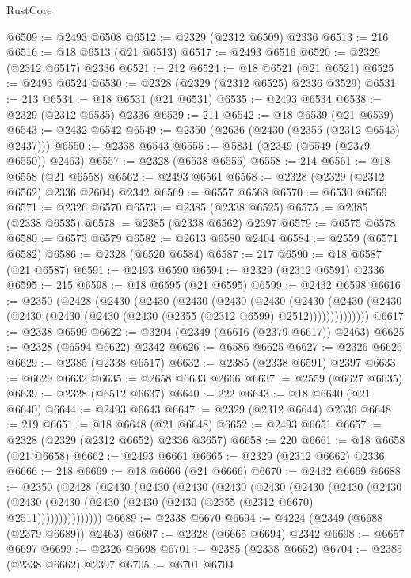 \begin{lexlean}{RustCore}
\begin{coremodule}
@6509 := @2493 @6508
@6512 := @2329 (@2312 @6509) @2336
@6513 := 216
@6516 := @18 @6513 (@21 @6513)
@6517 := @2493 @6516
@6520 := @2329 (@2312 @6517) @2336
@6521 := 212
@6524 := @18 @6521 (@21 @6521)
@6525 := @2493 @6524
@6530 := @2328 (@2329 (@2312 @6525) @2336 @3529)
@6531 := 213
@6534 := @18 @6531 (@21 @6531)
@6535 := @2493 @6534
@6538 := @2329 (@2312 @6535) @2336
@6539 := 211
@6542 := @18 @6539 (@21 @6539)
@6543 := @2432 @6542
@6549 := @2350 (@2636 (@2430 (@2355 (@2312 @6543) @2437)))
@6550 := @2338 @6543
@6555 := @5831 (@2349 (@6549 (@2379 @6550)) @2463)
@6557 := @2328 (@6538 @6555)
@6558 := 214
@6561 := @18 @6558 (@21 @6558)
@6562 := @2493 @6561
@6568 := @2328 (@2329 (@2312 @6562) @2336 @2604) @2342
@6569 := @6557 @6568
@6570 := @6530 @6569
@6571 := @2326 @6570
@6573 := @2385 (@2338 @6525)
@6575 := @2385 (@2338 @6535)
@6578 := @2385 (@2338 @6562) @2397
@6579 := @6575 @6578
@6580 := @6573 @6579
@6582 := @2613 @6580 @2404
@6584 := @2559 (@6571 @6582)
@6586 := @2328 (@6520 @6584)
@6587 := 217
@6590 := @18 @6587 (@21 @6587)
@6591 := @2493 @6590
@6594 := @2329 (@2312 @6591) @2336
@6595 := 215
@6598 := @18 @6595 (@21 @6595)
@6599 := @2432 @6598
@6616 := @2350
    (@2428
      (@2430
        (@2430
          (@2430
            (@2430
              (@2430
                (@2430
                  (@2430 (@2430 (@2430 (@2430 (@2430 (@2430 (@2355 (@2312 @6599) @2512))))))))))))))
@6617 := @2338 @6599
@6622 := @3204 (@2349 (@6616 (@2379 @6617)) @2463)
@6625 := @2328 (@6594 @6622) @2342
@6626 := @6586 @6625
@6627 := @2326 @6626
@6629 := @2385 (@2338 @6517)
@6632 := @2385 (@2338 @6591) @2397
@6633 := @6629 @6632
@6635 := @2658 @6633 @2666
@6637 := @2559 (@6627 @6635)
@6639 := @2328 (@6512 @6637)
@6640 := 222
@6643 := @18 @6640 (@21 @6640)
@6644 := @2493 @6643
@6647 := @2329 (@2312 @6644) @2336
@6648 := 219
@6651 := @18 @6648 (@21 @6648)
@6652 := @2493 @6651
@6657 := @2328 (@2329 (@2312 @6652) @2336 @3657)
@6658 := 220
@6661 := @18 @6658 (@21 @6658)
@6662 := @2493 @6661
@6665 := @2329 (@2312 @6662) @2336
@6666 := 218
@6669 := @18 @6666 (@21 @6666)
@6670 := @2432 @6669
@6688 := @2350
    (@2428
      (@2430
        (@2430
          (@2430
            (@2430
              (@2430
                (@2430
                  (@2430
                    (@2430
                      (@2430 (@2430 (@2430 (@2430 (@2430 (@2355 (@2312 @6670) @2511)))))))))))))))
@6689 := @2338 @6670
@6694 := @4224 (@2349 (@6688 (@2379 @6689)) @2463)
@6697 := @2328 (@6665 @6694) @2342
@6698 := @6657 @6697
@6699 := @2326 @6698
@6701 := @2385 (@2338 @6652)
@6704 := @2385 (@2338 @6662) @2397
@6705 := @6701 @6704

\end{coremodule}
\end{lexlean}
